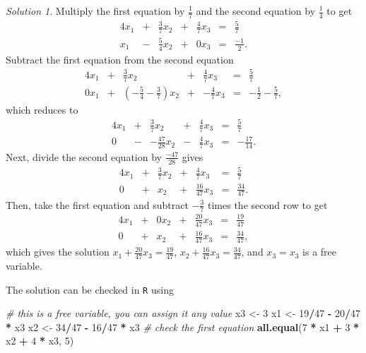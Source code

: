 \documentclass[
]{book}
\newenvironment{Shaded}{\begin{snugshade}}{\end{snugshade}}
\newcommand{\CommentTok}[1]{\textcolor[rgb]{0.56,0.35,0.01}{\textit{#1}}}
\newcommand{\DecValTok}[1]{\textcolor[rgb]{0.00,0.00,0.81}{#1}}
\newcommand{\KeywordTok}[1]{\textcolor[rgb]{0.13,0.29,0.53}{\textbf{#1}}}
\newcommand{\NormalTok}[1]{#1}
\newcommand{\OperatorTok}[1]{\textcolor[rgb]{0.81,0.36,0.00}{\textbf{#1}}}
\newcommand{\StringTok}[1]{\textcolor[rgb]{0.31,0.60,0.02}{#1}}
\theoremstyle{definition}
\theoremstyle{definition}
\theoremstyle{definition}
\theoremstyle{definition}
\theoremstyle{remark}
\newtheorem*{solution}{Solution}
\begin{document}
\begin{solution}

Multiply the first equation by \(\frac{1}{7}\) and the second equation by \(\frac{1}{4}\) to get
\begin{alignat*}{4}
x_1 & {}+{} & \frac{3}{7} x_2 & {}+{} & \frac{4}{7} x_3 & {}={} & \frac{5}{7} \\
x_1 & {}-{} & \frac{5}{4} x_2 & {}+{} & 0 x_3       & {}={} & \frac{-1}{2}.
\end{alignat*}
Subtract the first equation from the second equation
\begin{alignat*}{4}
x_1 & {}+{} & \frac{3}{7} x_2 & {}+{} & \frac{4}{7} x_3 & {}={} & \frac{5}{7} \\
0 x_1 & {}+{} &  (-\frac{5}{4} - \frac{3}{7}) x_2 &{}+{}& -\frac{4}{7} x_3  & {}={} & - \frac{1}{2} - \frac{5}{7},
\end{alignat*}
which reduces to
\begin{alignat*}{4}
x_1 & {}+{} & \frac{3}{7} x_2 & {}+{} & \frac{4}{7} x_3 & {}={} & \frac{5}{7} \\
0 & {}-{} &  -\frac{47}{28} x_2 &{}-{}& \frac{4}{7} x_3 & {}={} & -\frac{17}{14}.
\end{alignat*}
Next, divide the second equation by \(\frac{-47}{28}\) gives
\begin{alignat*}{4}
x_1 & {}+{} & \frac{3}{7} x_2 & {}+{} & \frac{4}{7} x_3 & {}={} & \frac{5}{7} \\
0 & {}+{} & x_2 &{}+{}& \frac{16}{47} x_3 & {}={} & \frac{34}{47}.
\end{alignat*}
Then, take the first equation and subtract \(-\frac{3}{7}\) times the second row to get
\begin{alignat*}{4}
x_1 & {}+{} & 0 x_2 & {}+{} & \frac{20}{47} x_3 & {}={} & \frac{19}{47} \\
0 & {}+{} & x_2 &{}+{}& \frac{16}{47} x_3 & {}={} & \frac{34}{47},
\end{alignat*}
which gives the solution
\(x_1 + \frac{20}{47} x_3 = \frac{19}{47}\), \(x_2 + \frac{16}{47} x_3 = \frac{34}{47}\), and \(x_3 = x_3\) is a free variable.

The solution can be checked in \texttt{R} using

\begin{Shaded}
\begin{Highlighting}[]
\CommentTok{# this is a free variable, you can assign it any value}
\NormalTok{x3 <-}\StringTok{ }\DecValTok{3}
\NormalTok{x1 <-}\StringTok{ }\DecValTok{19}\OperatorTok{/}\DecValTok{47} \OperatorTok{-}\StringTok{ }\DecValTok{20}\OperatorTok{/}\DecValTok{47} \OperatorTok{*}\StringTok{ }\NormalTok{x3}
\NormalTok{x2 <-}\StringTok{ }\DecValTok{34}\OperatorTok{/}\DecValTok{47} \OperatorTok{-}\StringTok{ }\DecValTok{16}\OperatorTok{/}\DecValTok{47} \OperatorTok{*}\StringTok{ }\NormalTok{x3}
\CommentTok{# check the first equation}
\KeywordTok{all.equal}\NormalTok{(}\DecValTok{7} \OperatorTok{*}\StringTok{ }\NormalTok{x1 }\OperatorTok{+}\StringTok{ }\DecValTok{3} \OperatorTok{*}\StringTok{ }\NormalTok{x2 }\OperatorTok{+}\StringTok{ }\DecValTok{4} \OperatorTok{*}\StringTok{ }\NormalTok{x3, }\DecValTok{5}\NormalTok{)}
\end{Highlighting}
\end{Shaded}


\end{solution}
\end{document}
